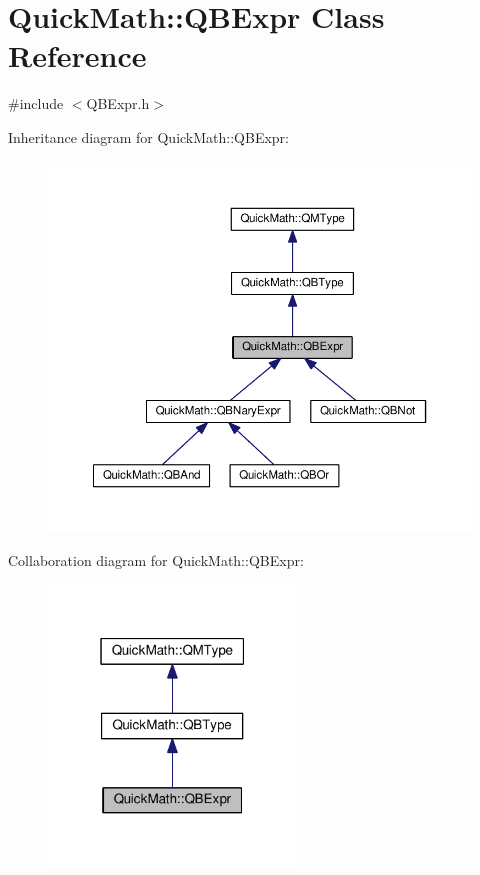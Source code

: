 \hypertarget{classQuickMath_1_1QBExpr}{}\section{Quick\+Math\+:\+:Q\+B\+Expr Class Reference}
\label{classQuickMath_1_1QBExpr}


{\ttfamily \#include $<$Q\+B\+Expr.\+h$>$}



Inheritance diagram for Quick\+Math\+:\+:Q\+B\+Expr\+:
\nopagebreak
\begin{figure}[H]
\begin{center}
\leavevmode
\includegraphics[width=350pt]{classQuickMath_1_1QBExpr__inherit__graph}
\end{center}
\end{figure}


Collaboration diagram for Quick\+Math\+:\+:Q\+B\+Expr\+:
\nopagebreak
\begin{figure}[H]
\begin{center}
\leavevmode
\includegraphics[width=187pt]{classQuickMath_1_1QBExpr__coll__graph}
\end{center}
\end{figure}
